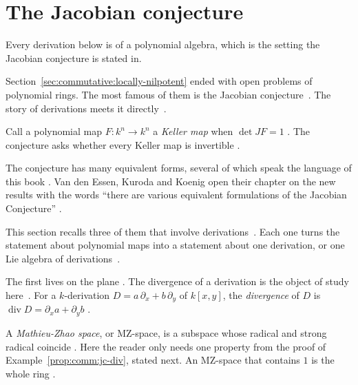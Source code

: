 \section{The Jacobian conjecture}\label{sec:commutative:jacobian}

Every derivation below is of a polynomial algebra, which is the setting the Jacobian conjecture is stated in.

Section~\ref{sec:commutative:locally-nilpotent} ended with open problems of
polynomial rings. The most famous of them is the Jacobian
conjecture~\cite[p.~91]{VanEssenKurodaKoenig2021}. The story of derivations
meets it directly~\cite[p.~91]{VanEssenKurodaKoenig2021}.

Call a polynomial map $F\colon k^n \to k^n$ a \emph{Keller map} when
$\det JF = 1$ \cite[p.~106]{VanEssenKurodaKoenig2021}. The conjecture asks
whether every Keller map is invertible
\cite[p.~106]{VanEssenKurodaKoenig2021}.

The conjecture has many equivalent forms, several of which speak the language
of this book \cite[p.~91]{VanEssenKurodaKoenig2021}. Van den Essen, Kuroda and
Koenig open their chapter on the new results with the words ``there are
various equivalent formulations of the Jacobian Conjecture''
\cite[p.~91]{VanEssenKurodaKoenig2021}.

This section recalls three of them that involve
derivations~\cite[p.~91]{VanEssenKurodaKoenig2021}. Each one turns the
statement about polynomial maps into a statement about one derivation, or one
Lie algebra of derivations~\cite[p.~91]{VanEssenKurodaKoenig2021}.

The first lives on the plane
\cite[Example~5.2.14, pp.~130--131]{VanEssenKurodaKoenig2021}. The divergence of a derivation is the object of study
here~\cite[p.~130]{VanEssenKurodaKoenig2021}. For a $k$-derivation
$D = a\,\partial_x + b\,\partial_y$ of $k[x, y]$, the \emph{divergence} of $D$
is $\operatorname{div} D = \partial_x a + \partial_y b$
\cite[p.~130]{VanEssenKurodaKoenig2021}.

A \emph{Mathieu-Zhao space}, or MZ-space, is a subspace whose radical and
strong radical coincide \cite[Definition~5.2.1, p.~123]{VanEssenKurodaKoenig2021}.
Here the reader only needs one property from the proof of
Example~\ref{prop:comm:jc-div}, stated next. An MZ-space that contains $1$ is
the whole ring \cite[Example~5.2.11, pp.~129--130]{VanEssenKurodaKoenig2021}.

